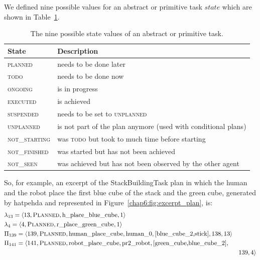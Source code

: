 \documentclass[a4paper,11pt,twoside]{StyleThese}
\begin{document}
We defined nine possible values for an abstract or primitive task $state$ which are shown in Table~\ref{chap6:tab:task_states}. 

\begin{table}[h]
	\centering
	\begin{tabular}{l|l}
		State            & Description         \\\hline\hline
		\textsc{planned} & needs to be done later        \\
		\textsc{todo}            & needs to be done now   \\
		\textsc{ongoing}          & is in progress       \\
		\textsc{executed}         & is achieved               \\
		\textsc{suspended}        & needs to be set to \textsc{unplanned}\\ 
		\textsc{unplanned} & is not part of the plan anymore (used with conditional plans) \\
		\textsc{not\_starting}    & was \textsc{todo} but took to much time before starting \\
		\textsc{not\_finished}     & was started but has not been achieved    \\
		\textsc{not\_seen}         & was achieved but has not been observed by the other agent    
	\end{tabular}
	\caption{The nine possible state values of an abstract or primitive task.}
	\label{chap6:tab:task_states}
\end{table}

So, for example, an excerpt of the StackBuildingTask plan in which the human and the robot place the first blue cube of the stack and the green cube, generated by \acrshort{hatpehda} and represented in Figure~\ref{chap6:fig:excerpt_plan}, is:
\thispagestyle{example}
\begin{align*}
&\lambda_{13}=\langle 13,\textsc{Planned},\text{h\_place\_blue\_cube},1\rangle \\
&\lambda_{4}=\langle 4,\textsc{Planned},\text{r\_place\_green\_cube},1\rangle \\
&\Pi_{139}=\langle 139,\textsc{Planned},\text{human\_place\_cube},\text{human\_0}, [\text{blue\_cube\_2,stick}],138,13\rangle \\
&\Pi_{141}=\langle 141,\textsc{Planned},\text{robot\_place\_cube},\text{pr2\_robot},[\text{green\_cube,blue\_cube\_2}], &\\  & &139,4\rangle
\end{align*}
\end{document}
